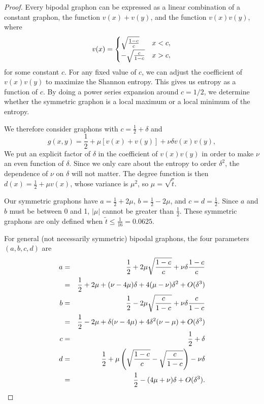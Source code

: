 \documentclass[12pt]{amsart}
\newcommand{\1}{\mathbf{1}}
\begin{document}
\begin{proof}
Every bipodal graphon can be expressed as a linear combination of 
a constant graphon, the function $v(x)+v(y)$, and the function $v(x)v(y)$, where 
\begin{equation}
v(x) = \begin{cases} \sqrt{\frac{1-c}{c}} & x < c, \cr 
- \sqrt{\frac{c}{1-c}} & x>c, 
\end{cases}
\end{equation}
for some constant $c$. For any fixed value of $c$, we can adjust the coefficient of 
$v(x)v(y)$ to maximize the Shannon entropy. This gives us entropy as a function of 
$c$. By doing a power series expansion around $c=1/2$, we determine whether the symmetric
graphon is a local maximum or a local minimum of the entropy. 

We therefore consider graphons with $c = \frac12 + \delta$ and 
\begin{equation}
g(x,y) = \frac12 + \mu [v(x)+ v(y)] + \nu \delta v(x) v(y), 
\end{equation}
We put an explicit factor of $\delta$ in the coefficient of $v(x)v(y)$ in order to make
$\nu$ an even function of $\delta$. Since we only care about the entropy to order $\delta^2$,
the dependence of $\nu$ on $\delta$ will not matter. The degree function is then 
$d(x) = \frac12 + \mu v(x)$, whose variance is $\mu^2$, so $\mu = \sqrt{\tilde t}$. 

Our symmetric graphons have $a=\frac12 + 2\mu$, $b=\frac12 - 2\mu$, and $c=d=\frac12$.
Since $a$ and $b$ must be between 0 and 1, $|\mu|$ cannot be greater than $\frac12$.
These symmetric graphons are only defined when $\tilde t \le \frac{1}{16} = 0.0625$. 

For general (not necessarily symmetric) bipodal graphons, the four parameters $(a,b,c,d)$
are
\begin{eqnarray} 
a & = & \frac12 + 2\mu \sqrt{\frac{1-c}{c}} + \nu \delta \frac{1-c}{c} \cr 
& = & \frac12 + 2\mu + (\nu - 4\mu)\delta + 4(\mu-\nu)\delta^2 + O(\delta^3) \cr 
b & = & \frac12 - 2\mu \sqrt{\frac{c}{1-c}} + \nu \delta \frac{c}{1-c} \cr 
& = & \frac12 - 2\mu + \delta(\nu-4\mu) + 4\delta^2(\nu-\mu) + O(\delta^3) \cr 
c & = & \frac12 + \delta \cr 
d & = & \frac12 + \mu \left ( \sqrt{\frac{1-c}{c}} - \sqrt{\frac{c}{1-c}} \right ) - \nu \delta \cr
& = & \frac12 - (4\mu + \nu) \delta + O(\delta^3).
\end{eqnarray}


\end{proof}
\end{document}
